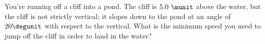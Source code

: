 You're running off a cliff into a pond. The cliff is $5.0\ \munit$ above the
water, but the cliff is not strictly vertical; it slopes down to the
pond at an angle of $20\degunit$ with respect to the vertical. What
is the minimum speed you need to jump off the cliff in order to land
in the water?
